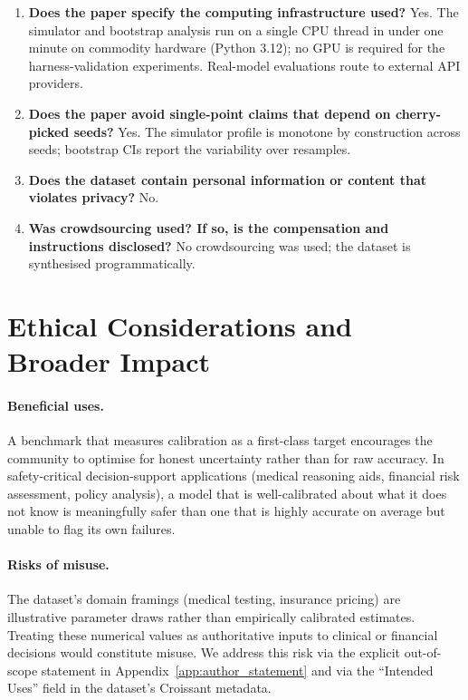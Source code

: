 \documentclass{article}
\begin{document}
\begin{enumerate}[leftmargin=*,itemsep=2pt]
    \item \textbf{Does the paper specify the computing infrastructure used?} Yes. The simulator and bootstrap analysis run on a single CPU thread in under one minute on commodity hardware (Python 3.12); no GPU is required for the harness-validation experiments. Real-model evaluations route to external API providers.
    \item \textbf{Does the paper avoid single-point claims that depend on cherry-picked seeds?} Yes. The simulator profile is monotone by construction across seeds; bootstrap CIs report the variability over resamples.
    \item \textbf{Does the dataset contain personal information or content that violates privacy?} No.
    \item \textbf{Was crowdsourcing used? If so, is the compensation and instructions disclosed?} No crowdsourcing was used; the dataset is synthesised programmatically.
\end{enumerate}


\section{Ethical Considerations and Broader Impact}
\label{app:ethics}

\paragraph{Beneficial uses.} A benchmark that measures calibration as a first-class target encourages the community to optimise for honest uncertainty rather than for raw accuracy. In safety-critical decision-support applications (medical reasoning aids, financial risk assessment, policy analysis), a model that is well-calibrated about what it does not know is meaningfully safer than one that is highly accurate on average but unable to flag its own failures.

\paragraph{Risks of misuse.} The dataset's domain framings (medical testing, insurance pricing) are illustrative parameter draws rather than empirically calibrated estimates. Treating these numerical values as authoritative inputs to clinical or financial decisions would constitute misuse. We address this risk via the explicit out-of-scope statement in Appendix~\ref{app:author_statement} and via the ``Intended Uses'' field in the dataset's Croissant metadata.
\end{document}

